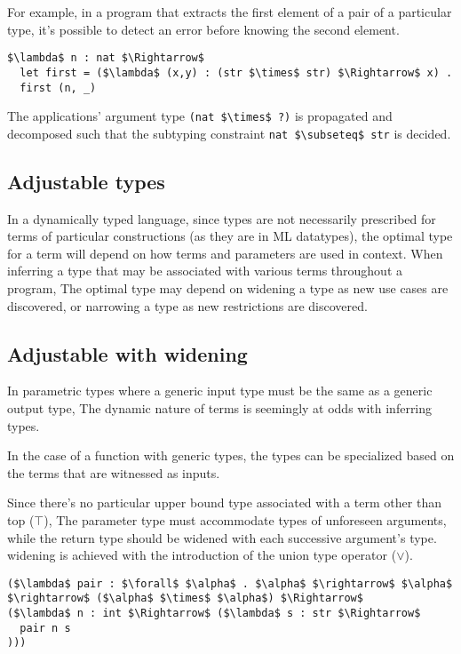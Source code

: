 \documentclass[sigplan]{acmart}
\theoremstyle{definition}
\begin{document}
For example, in a program that extracts 
the first element of a pair of a particular type, 
it's possible to detect an error before knowing the second element.

\begin{lstlisting}
$\lambda$ n : nat $\Rightarrow$
  let first = ($\lambda$ (x,y) : (str $\times$ str) $\Rightarrow$ x) .
  first (n, _) 
\end{lstlisting}

\noindent The  applications' argument type \lstinline{(nat $\times$ ?)} 
is propagated and decomposed such that the subtyping constraint 
\lstinline{nat $\subseteq$ str} is decided. 

\subsection{Adjustable types}

In a dynamically typed language, since types are not necessarily prescribed
for terms of particular constructions (as they are in ML datatypes), 
the optimal type for a term will depend on how terms and parameters are used in context. 
When inferring a type that may be associated with various terms throughout a program,  
The optimal type may depend on widening a type as new use cases are discovered,
or narrowing a type as new restrictions are discovered. 

\subsection{Adjustable with widening}

In parametric types where a generic input type must be the same as a generic output type,
The dynamic nature of terms is seemingly at odds with inferring types.

In the case of a function with generic types, 
the types can be specialized based on the terms that are witnessed as inputs. 

Since there's no particular upper bound type associated with 
a term other than top ($\top$), 
The parameter type must accommodate types of unforeseen arguments, 
while the return type should be widened with each successive
argument's type.
widening is achieved with the introduction of the union type operator ($\vee$).

\begin{lstlisting}
($\lambda$ pair : $\forall$ $\alpha$ . $\alpha$ $\rightarrow$ $\alpha$ $\rightarrow$ ($\alpha$ $\times$ $\alpha$) $\Rightarrow$ 
($\lambda$ n : int $\Rightarrow$ ($\lambda$ s : str $\Rightarrow$ 
  pair n s
)))
\end{lstlisting}
\end{document}
